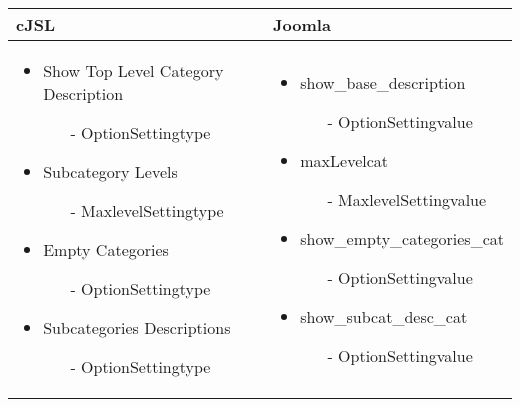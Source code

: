 \begin{minipage}{0.7\textwidth}
\begin{tabular}{| p{}|p{}|}
\hline
\textbf{cJSL} & \textbf{Joomla} \\ 
\hline
\begin{itemize}
	\item Show Top Level Category Description
	\begin{enumerate}
			 \item[-] OptionSettingtype
	\end{enumerate} 
	\item Subcategory Levels 
		\begin{enumerate}
				 \item[-] MaxlevelSettingtype
		\end{enumerate}
	\item Empty Categories 
		\begin{enumerate}
			 \item[-] OptionSettingtype
		\end{enumerate}
	\item Subcategories Descriptions
	 \begin{enumerate}
	 		 \item[-] OptionSettingtype
	 \end{enumerate}
\end{itemize}
 & 
\begin{itemize}
	\item show\_base\_description
	\begin{enumerate}
			 \item[-] OptionSettingvalue
	\end{enumerate} 
	\item maxLevelcat 
		\begin{enumerate}
				 \item[-] MaxlevelSettingvalue
		\end{enumerate}
	\item show\_empty\_categories\_cat 
		\begin{enumerate}
			 \item[-] OptionSettingvalue
		\end{enumerate}
	\item show\_subcat\_desc\_cat
	 \begin{enumerate}
	 		 \item[-] OptionSettingvalue
	 \end{enumerate}
\end{itemize}
\\
\hline
\end{tabular}
\end{minipage}


